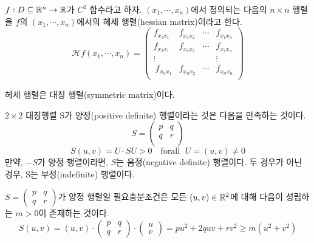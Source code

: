 \begin{definition}[헤세 행렬]
$f: D \subseteq \mathbb{R}^n \to \mathbb{R}$가 $C^2$ 함수라고 하자. $(x_1,\cdots,x_n)$에서 정의되는 다음의 $n \times n$ 행렬을 $f$의 $(x_1,\cdots,x_n)$에서의 헤세 행렬(hessian matrix)이라고 한다.
\begin{equation*}
\mathcal{H}f(x_1,\cdots,x_n)=
\begin{pmatrix}
f_{x_1x_1} & f_{x_1x_2} & \cdots & f_{x_1x_n} \\
f_{x_2x_1} & f_{x_2x_2} & \cdots & f_{x_2x_n} \\
\vdots & & & \vdots  \\\
f_{x_nx_1} & f_{x_nx_2} & \cdots & f_{x_nx_n} \\
\end{pmatrix}
\end{equation*}
\end{definition}

헤세 행렬은 대칭 행렬(symmetric matrix)이다.

\begin{definition}[양정 행렬]
$2 \times 2$ 대칭행렬 S가 양정(positive definite) 행렬이라는 것은 다음을 만족하는 것이다.
\begin{equation*}
S=
\begin{pmatrix}
p & q \\
q & r \\
\end{pmatrix}
\end{equation*}
$$S(u,v)=U \cdot SU > 0 \quad\text{forall }\; U=(u,v) \neq 0$$
만약, $-S$가 양정 행렬이라면, $S$는 음정(negative definite) 행렬이다. 두 경우가 아닌 경우, S는 부정(indefinite) 행렬이다.
\end{definition}

\begin{theorem}
$S = \begin{pmatrix} p & q \\ q & r \end{pmatrix}$가 양정 행렬일 필요충분조건은  모든 $(u,v) \in \mathbb{R}^2$에 대해 다음이 성립하는 $m>0$이 존재하는 것이다.
$$
S(u,v)=(u,v) \cdot \begin{pmatrix} p & q \\ q & r \end{pmatrix} \cdot \begin{pmatrix} u \\ v \end{pmatrix} = pu^2 + 2quv + rv^2 \geq m(u^2+v^2)
$$
\end{theorem}

